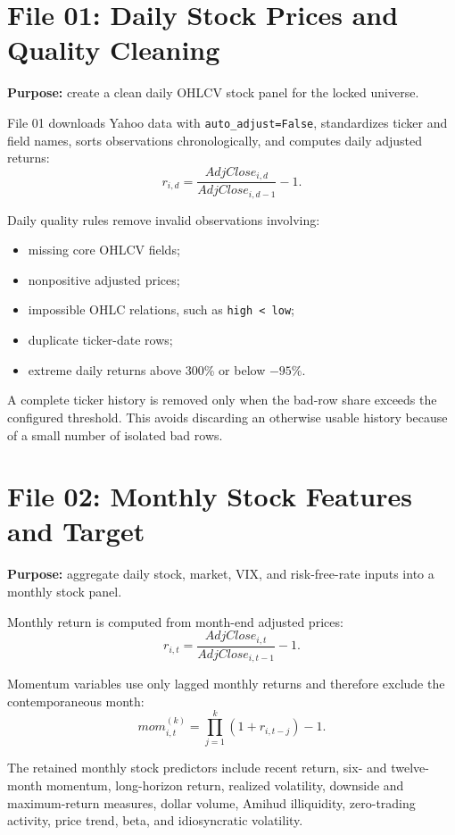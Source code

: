 \documentclass[11pt,a4paper]{article}
\newcommand{\code}[1]{\texttt{#1}}
\begin{document}
\section{File 01: Daily Stock Prices and Quality Cleaning}

\textbf{Purpose:} create a clean daily OHLCV stock panel for the locked universe.

File 01 downloads Yahoo data with \code{auto\_adjust=False}, standardizes ticker and field names, sorts observations chronologically, and computes daily adjusted returns:
\[
  r_{i,d}=\frac{AdjClose_{i,d}}{AdjClose_{i,d-1}}-1.
\]

Daily quality rules remove invalid observations involving:
\begin{itemize}
  \item missing core OHLCV fields;
  \item nonpositive adjusted prices;
  \item impossible OHLC relations, such as \code{high < low};
  \item duplicate ticker-date rows;
  \item extreme daily returns above 300\% or below $-95\%$.
\end{itemize}

A complete ticker history is removed only when the bad-row share exceeds the configured threshold. This avoids discarding an otherwise usable history because of a small number of isolated bad rows.

\section{File 02: Monthly Stock Features and Target}

\textbf{Purpose:} aggregate daily stock, market, VIX, and risk-free-rate inputs into a monthly stock panel.

Monthly return is computed from month-end adjusted prices:
\[
  r_{i,t}=\frac{AdjClose_{i,t}}{AdjClose_{i,t-1}}-1.
\]

Momentum variables use only lagged monthly returns and therefore exclude the contemporaneous month:
\[
  mom_{i,t}^{(k)}=\prod_{j=1}^{k}(1+r_{i,t-j})-1.
\]

The retained monthly stock predictors include recent return, six- and twelve-month momentum, long-horizon return, realized volatility, downside and maximum-return measures, dollar volume, Amihud illiquidity, zero-trading activity, price trend, beta, and idiosyncratic volatility.
\end{document}
